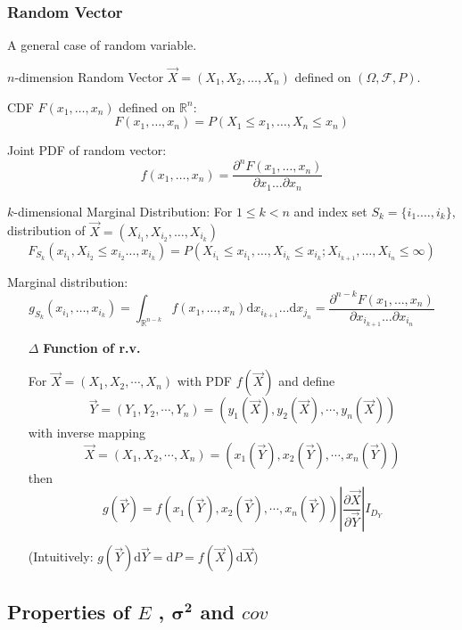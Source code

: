 \subsubsection{Random Vector}
    A general case of random variable.

    $n$-dimension Random Vector $\vec{X}=(X_1,X_2,\ldots,X_n)$ defined on $(\Omega,\mathscr{F},P)$.

    CDF $F(x_1,\ldots,x_n)$ defined on $\mathbb{R}^n$:
    \[F(x_1,\ldots,x_n)=P(X_1\leq x_1,\ldots,X_n\leq x_n)\]

    Joint PDF of random vector: 
    \[
        f(x_1,\ldots,x_n)=\dfrac{\partial^n F(x_1,\ldots,x_n)}{\partial x_1\ldots\partial x_n}
    \]

    $k$-dimensional Marginal Distribution: For $1\leq k<n$ and index set $S_k=\{i_1.\ldots,i_k\}$, distribution of $\vec{X}=(X_{i_1},X_{i_2},\ldots,X_{i_k})$
    \[F_{S_k}(x_{i_1},X_{i_2}\leq x_{i_2}\ldots,x_{i_k})=P(X_{i_1}\leq x_{i_1},\ldots,X_{i_k}\leq x_{i_k};X_{i_{k+1}},\ldots,X_{i_n}\leq\infty)\]

    Marginal distribution: 
    \[
        g_{S_k}(x_{i_1},\ldots,x_{i_k})=\int_{\mathbb{R}^{n-k}}f(x_1,\ldots,x_n)\mathrm{d}x_{i_{k+1}}\ldots\mathrm{d}x_{j_n}=\dfrac{\partial^{n-k}F(x_1,\ldots,x_n)}{\partial x_{i_{k+1}}\ldots\partial x_{i_n}}
    \]


    \begin{itemize}
        \item[$\Delta$] \textbf{Function of r.v.}
        
        For $\vec{X}=(X_1,X_2,\cdots,X_n)$ with PDF $f(\vec{X})$ and define 
        \[
            \vec{Y}=(Y_1,Y_2,\cdots,Y_n)=(y_1(\vec{X}),y_2(\vec{X}),\cdots,y_n(\vec{X}))
        \]
        with inverse mapping
        \[
            \vec{X}=(X_1,X_2,\cdots,X_n)=(x_1(\vec{Y}),x_2(\vec{Y}),\cdots,x_n(\vec{Y}))
        \]
        then
        \[
            g(\vec{Y})= f(x_1(\vec{Y}),x_2(\vec{Y}),\cdots,x_n(\vec{Y}))\left|\frac{\partial \vec{X}}{\partial\vec{Y}}\right|I_{D_Y}
        \]

        (Intuitively: $g(\vec{Y})\mathrm{d}\vec{Y}=\mathrm{d}P=f(\vec{X})\mathrm{d}\vec{X}$)
    \end{itemize}




\subsection{Properties of $E$ , $\mathbf{\sigma^2}$ and $cov$}

